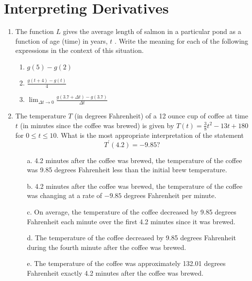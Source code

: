 \documentclass[12pt]{report}
\begin{document}
\newcommand{\less}{\textless}
\newcommand{\greater}{\textgreater}
\newcommand{\reals}{\mathbb{R}}
\newcommand{\integers}{\mathbb{Z}}
\newcommand{\rationals}{\mathbb{Q}}
\newcommand{\dsp}{\displaystyle}


\section*{Interpreting Derivatives}

\begin{enumerate}

\item The function $L$ gives the average length of salmon in a particular pond as a function of age (time) in years, $t$ . Write the meaning for each of the following expressions in the context of this situation.

\begin{enumerate}

\item $g(5)-g(2)$

\item $\frac{g(t+4)-g(t)}{4}$

\item $\lim_{\Delta t\rightarrow 0}\frac{g(3.7+\Delta t)-g(3.7)}{\Delta t}$

\end{enumerate}

\item  The temperature $T$ (in degrees Fahrenheit) of a 12 ounce cup of coffee at time $t$ (in minutes since the coffee was brewed) is given by $T(t) = \frac{3}{8}t^2-13t+180$ for $0\le t\le 10$. What is the most appropriate interpretation of the statement
\[
T^\prime(4.2) = -9.85?
\]
\begin{enumerate}
\item [a.] 4.2 minutes after the coffee was brewed, the temperature of the coffee was 9.85 degrees Fahrenheit less than the initial brew temperature. \vspace{0.2cm}
\item [b.]  4.2 minutes after the coffee was brewed, the temperature of the coffee was changing at a rate of $-9.85$ degrees Fahrenheit per minute.\vspace{0.2cm}
\item [c.] On average, the temperature of the coffee decreased by 9.85 degrees Fahrenheit each minute over the first 4.2 minutes since it was brewed. \vspace{0.2cm} 
\item [d.]  The temperature of the coffee decreased by 9.85 degrees Fahrenheit during the fourth minute after the coffee was brewed. \vspace{0.2cm}  
\item [e.] The temperature of the coffee was approximately 132.01 degrees Fahrenheit exactly 4.2 minutes after the coffee was brewed.
\end{enumerate}


\end{enumerate}
\end{document}
